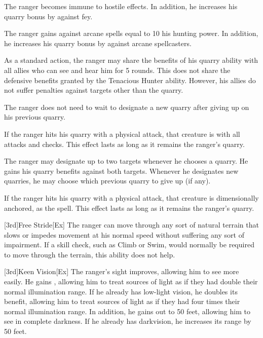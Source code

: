         The ranger becomes immune to hostile  effects.
        In addition, he increases his quarry bonus by  against fey.

        The ranger gains  against arcane spells equal to 10 \add his hunting power.
        In addition, he increases his quarry bonus by  against arcane spellcasters.

        As a standard action, the ranger may share the benefits of his quarry ability with all allies who can see and hear him for 5 rounds.
        This does not share the defensive benefits granted by the Tenacious Hunter ability.
        However, his allies do not suffer penalties against targets other than the quarry.

        The ranger does not need to wait to designate a new quarry after giving up on his previous quarry.

        If the ranger hits his quarry with a physical attack, that creature is \impaired with all attacks and checks.
        This effect lasts as long as it remains the ranger's quarry.

        The ranger may designate up to two targets whenever he chooses a quarry.
        He gains his quarry benefits against both targets.
        Whenever he designates new quarries, he may choose which previous quarry to give up (if any).

        If the ranger hits his quarry with a physical attack, that creature is dimensionally anchored, as the  spell.
        This effect lasts as long as it remains the ranger's quarry.

        [3rd]{Free Stride}[Ex]
        The ranger can move through any sort of natural terrain that slows or impedes movement at his normal speed without suffering any sort of impairment.
        If a skill check, such as Climb or Swim, would normally be required to move through the terrain, this ability does not help.

        [3rd]{Keen Vision}[Ex]
        The ranger's sight improves, allowing him to see more easily.
        He gains , allowing him to treat sources of light as if they had double their normal illumination range.
        If he already has low-light vision, he doubles its benefit, allowing him to treat sources of light as if they had four times their normal illumination range.
        In addition, he gains  out to 50 feet, allowing him to see in complete darkness.
        If he already has darkvision, he increases its range by 50 feet.

